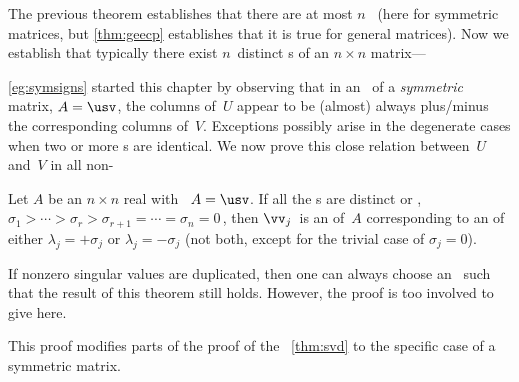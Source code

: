 The previous theorem establishes that there are at most \(n\)~ (here for symmetric matrices, but \cref{thm:geecp} establishes that it is true for general matrices).  
Now we establish that typically there exist \(n\)~distinct s of an \(n\times n\) matrix---

\begin{comment}
The problem case of repeated singular values and repeated eigenvalues appears to be not adequately dealt with by any first textbook that I have read.
\pooliv{p.294} discusses algebraic and geometric {multiplicity}, but best left for eigen-problem of general matrices, if necessary.
\end{comment}



\cref{eg:symsigns} started this chapter by observing that in an \svd\ of a \emph{symmetric} matrix, \(A=\usv\), the columns of~\(U\) appear to be (almost) always plus\slash minus the corresponding columns of~\(V\).
Exceptions possibly arise in the degenerate cases when two or more s are identical.
We now prove this close relation between~\(U\) and~\(V\) in all non-


\begin{theorem} \label{thm:smevec}
Let \(A\) be an \(n\times n\) real  with \svd\ \(A=\usv\).
If all the s are distinct or , \(\sigma_1>\cdots>\sigma_r>\sigma_{r+1}=\cdots=\sigma_n=0\)\,, then \(\vv_j\)~is an  of~\(A\) corresponding to an  of either \(\lambda_j=+\sigma_j\) or \(\lambda_j=-\sigma_j\) (not both, except for the trivial case of \(\sigma_j=0\)).
\end{theorem}

If nonzero singular values are duplicated, then one can always choose an \svd\ such that the result of this theorem still holds.
However, the proof is too involved to give here.

This proof modifies parts of the proof of the \svd\ \cref{thm:svd} to the specific case of a symmetric matrix.

